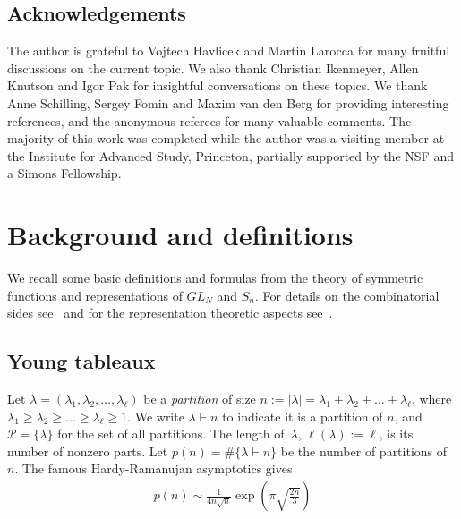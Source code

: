 \documentclass[11pt]{amsart}
\newcommand{\darkblue}{\color{darkblue}}
\newcommand{\defn}[1]{\emph{\darkblue #1}}
\theoremstyle{plain}
\theoremstyle{definition}
\numberwithin{equation}{section}
\newcommand{\la}{\lambda}
\newcommand{\cP}{\mathcal P}
\def\ts{\hskip.03cm}
\def\la{\lambda}
\begin{document}
\subsection*{Acknowledgements}
The author is grateful to Vojtech Havlicek and Martin Larocca for many fruitful discussions on the current topic. We also thank Christian Ikenmeyer, Allen Knutson and Igor Pak for insightful conversations on these topics. We thank Anne Schilling, Sergey Fomin and Maxim van den Berg for providing interesting references, and the anonymous referees for many valuable comments. The majority of this work was completed while the author was a visiting member at the Institute for Advanced Study, Princeton, partially supported by the NSF and a Simons Fellowship.


\section{Background and definitions}\label{sec:defn}

We recall some basic definitions and formulas from the theory of symmetric functions and representations of $GL_N$ and $S_n$. For details on the combinatorial sides see~\cite{Mac,S1} and for the representation theoretic aspects see~\cite{Fu97,Sag}.


\subsection{Young tableaux} \label{ss:basics}
Let $\la=(\la_1,\la_2,\ldots,\la_\ell)$ be a \defn{partition}
of size $n:=|\la|=\la_1+\la_2+\ldots+\la_\ell$, where
$\la_1\ge \la_2 \ge \ldots \ge\la_\ell\ge 1$.  We write
$\la\vdash n$ to indicate it is a partition of $n$, and $\cP=\{\la\}$ for
the set of all partitions.  The length of~$\la$, $\ell(\la):=\ell$, is its number of nonzero parts.  Let $p(n) =\#\{\la \vdash n\}$ be the number of partitions of $n$. The famous Hardy-Ramanujan asymptotics gives
\begin{align}\label{eq:pn}
p(n) \sim \frac{1}{4n\sqrt{n}} \exp\left(\pi \sqrt{\frac{2n}{3}} \right)
\end{align}

\end{document}
